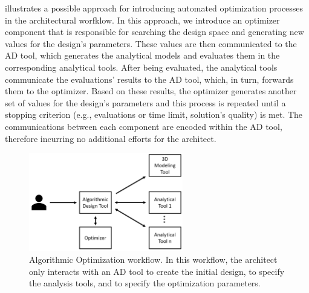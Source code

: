  illustrates a possible approach for introducing automated optimization processes in the architectural worfklow. In this approach, we introduce an optimizer component that is responsible for searching the design space and generating new values for the design's parameters. These values are then communicated to the \ac{AD} tool, which generates the analytical models and evaluates them in the corresponding analytical tools. After being evaluated, the analytical tools communicate the evaluations' results to the \ac{AD} tool, which, in turn, forwards them to the optimizer. Based on these results, the optimizer generates another set of values for the design's parameters and this process is repeated until a stopping criterion (e.g., evaluations or time limit, solution's quality) is met. The communications between each component are encoded within the \ac{AD} tool, therefore incurring no additional efforts for the architect.
 
 \begin{figure}[htbp]
 	\centering
 	\includegraphics[width=0.6\textwidth]{./Images/Solution/algorithmic_optimization.png}
 	\caption[Algorithmic Optimization workflow]{Algorithmic Optimization workflow. In this workflow, the architect only interacts with an \ac{AD} tool to create the initial design, to specify the analysis tools, and to specify the optimization parameters.}
 	\label{fig:algorithmicoptimization}
 \end{figure}
 

